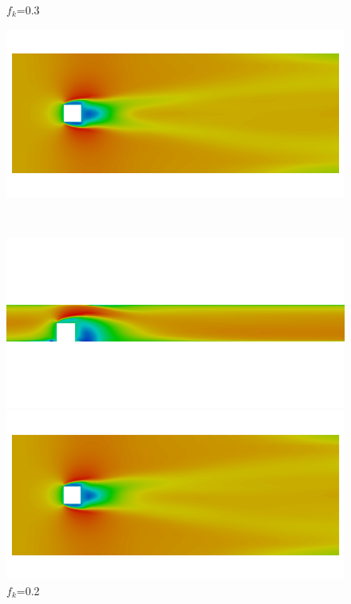 \begin{figure}[H]
\begin{minipage}[b]{0.5\linewidth}
\caption*{$f_k$=0.3}
\end{minipage}
\begin{minipage}[b]{0.5\linewidth}
\includegraphics[scale=0.25]{figure/coarse/three/Umean_y.png}
\caption*{}
\end{minipage}\\
\begin{minipage}[b]{0.5\linewidth}
\includegraphics[scale=0.25]{figure/coarse/two/Umean_z.png}
\caption*{$f_k$=0.2}
\end{minipage}
\begin{minipage}[b]{0.5\linewidth}
\includegraphics[scale=0.25]{figure/coarse/two/Umean_y.png}

\end{minipage}
\end{figure}
